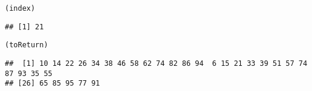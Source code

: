\documentclass{article}\usepackage[]{graphicx}\usepackage[]{xcolor}
\makeatletter
\newcommand{\hldef}[1]{\textcolor[rgb]{0.345,0.345,0.345}{#1}}%
\newenvironment{kframe}{%
 \def\at@end@of@kframe{}%
 \ifinner\ifhmode%
  \def\at@end@of@kframe{\end{minipage}}%
  \begin{minipage}{\columnwidth}%
 \fi\fi%
 \def\FrameCommand##1{\hskip\@totalleftmargin \hskip-\fboxsep
 \colorbox{shadecolor}{##1}\hskip-\fboxsep
     \hskip-\linewidth \hskip-\@totalleftmargin \hskip\columnwidth}%
 \MakeFramed {\advance\hsize-\width
   \@totalleftmargin\z@ \linewidth\hsize
   \@setminipage}}%
 {\par\unskip\endMakeFramed%
 \at@end@of@kframe}
\newenvironment{knitrout}{}{} %
\makeatother
\begin{document}
\begin{enumerate}
\begin{knitrout}
\begin{kframe}
\begin{alltt}
\hldef{(index)}
\end{alltt}
\begin{verbatim}
## [1] 21
\end{verbatim}
\begin{alltt}
\hldef{(toReturn)}
\end{alltt}
\begin{verbatim}
##  [1] 10 14 22 26 34 38 46 58 62 74 82 86 94  6 15 21 33 39 51 57 74 87 93 35 55
## [26] 65 85 95 77 91
\end{verbatim}
\end{kframe}
\end{knitrout}
\end{enumerate}


\end{document}

